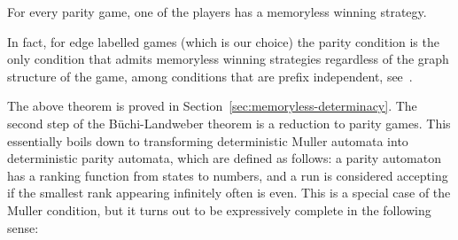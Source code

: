 \begin{theorem}\label{thm:parity-memoryless}
For every parity game, one of the players has a memoryless winning strategy.	
\end{theorem}

In fact, for edge labelled games (which is our choice) the parity condition is the only condition that admits memoryless winning strategies regardless of the graph structure of the game, among conditions that are prefix independent, see~\cite[Theorem 4]{Colcombet:2006fv}.


The above theorem is proved in Section~\ref{sec:memoryless-determinacy}. The second step of the Büchi-Landweber theorem is a reduction to parity games. 
 This essentially boils down to transforming deterministic Muller automata into deterministic parity automata, which are defined as follows: a parity  automaton has  a ranking function from states to numbers, and a run is considered accepting if the smallest rank appearing infinitely often is even. This is a special case of the Muller condition, but it turns out to be expressively complete in the following sense:

